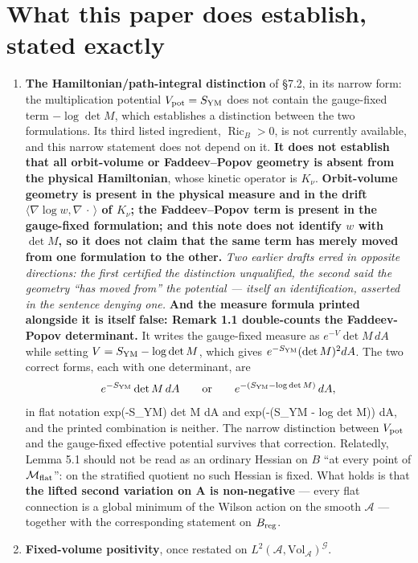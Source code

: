 \documentclass[11pt]{article}
\newcommand{\A}{\mathcal A}
\newcommand{\G}{\mathcal G}
\newcommand{\Mf}{\mathcal M_{\rm flat}}
\begin{document}
\section{What this paper does establish, stated exactly}

\begin{enumerate}\setlength{\itemsep}{0pt}
\item \textbf{The Hamiltonian/path-integral distinction} of \S7.2, in its narrow form:
the multiplication potential $V_{\rm pot}=S_{\rm YM}$ does not contain the gauge-fixed
term $-\log\det M$, which establishes a distinction between the two formulations. Its
third listed ingredient, $\operatorname{Ric}_B>0$, is not currently available, and this
narrow statement does not depend on it. \textbf{It does not establish that all
orbit-volume or Faddeev--Popov geometry is absent from the physical Hamiltonian}, whose
kinetic operator is $K_\nu$. \textbf{Orbit-volume geometry is present in the physical
measure and in the drift $\langle\nabla\log w,\nabla\,\cdot\,\rangle$ of $K_\nu$; the
Faddeev--Popov term is present in the gauge-fixed formulation; and this note does not
identify $w$ with $\det M$, so it does not claim that the same term has merely moved
from one formulation to the other.} \emph{Two earlier drafts erred in opposite
directions: the first certified the distinction unqualified, the second said the
geometry ``has moved from'' the potential --- itself an identification, asserted in the
sentence denying one.}
\textbf{And the measure formula printed alongside it is itself false: Remark 1.1
double-counts the Faddeev-Popov determinant.} It writes the gauge-fixed measure as
$e^{-V}\det M\,dA$ while setting $V=S_{\rm YM}-\log\det M$, which gives
$e^{-S_{\rm YM}}(\det M)^2dA$. The two correct forms, each with one determinant, are
\[
e^{-S_{\rm YM}}\det M\,dA
\qquad\text{or}\qquad
e^{-(S_{\rm YM}-\log\det M)}\,dA ,
\]
in flat notation exp(-S\_YM) det M dA and exp(-(S\_YM - log det M)) dA, and the printed
combination is neither. The narrow distinction between $V_{\rm pot}$ and
the gauge-fixed effective potential survives that correction.
Relatedly, Lemma 5.1 should not be read as an ordinary Hessian on $B$ ``at every point
of $\Mf$'': on the stratified quotient no such Hessian is fixed. What holds is that
\textbf{the lifted second variation on A is non-negative} --- every flat connection is a
global minimum of the Wilson action on the smooth $\A$ --- together with the
corresponding statement on $B_{\rm reg}$.
\item \textbf{Fixed-volume positivity}, once restated on $L^2(\A,\mathrm{Vol}_\A)^\G$.

\end{enumerate}
\end{document}
